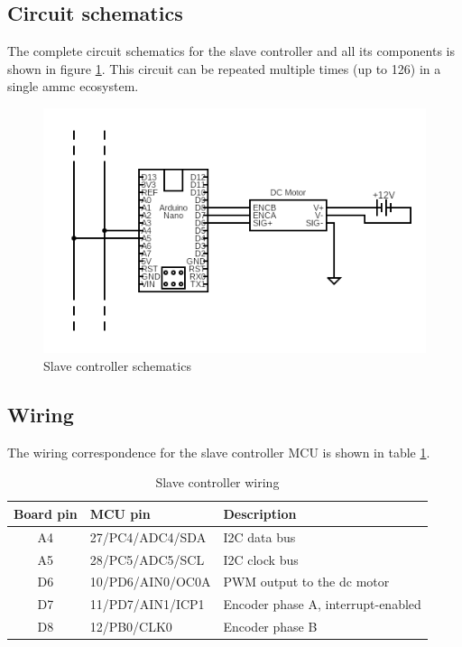 \documentclass[binding=0.6cm,Lau]{sapthesis}
\makeatletter
\def\maxwidth#1{\ifdim\Gin@nat@width>#1 #1\else\Gin@nat@width\fi}
\makeatother
\begin{document}
\subsection{Circuit schematics}
The complete circuit schematics for the slave controller and all its components
is shown in figure \ref{img:slave-sch}. This circuit can be repeated multiple
times (up to 126) in a single ammc ecosystem.
\begin{figure}[hbp]
\begin{centering}
  \includegraphics[width=\maxwidth{\textwidth}]{img/slave-schematics}
  \caption{Slave controller schematics}
  \label{img:slave-sch}
\end{centering}
\end{figure}

\subsection{Wiring}
The wiring correspondence for the slave controller MCU is shown in table
\ref{tab:slave-wiring}.
\begin{table}[hb]
  \begin{tabularx}{\textwidth}{c l X}
    \toprule
    Board pin & MCU pin & Description \\
    \midrule
    A4 & 27/PC4/ADC4/SDA  & I2C data bus \\
    A5 & 28/PC5/ADC5/SCL  & I2C clock bus \\
    D6 & 10/PD6/AIN0/OC0A & PWM output to the dc motor \\
    D7 & 11/PD7/AIN1/ICP1 & Encoder phase A, interrupt-enabled \\
    D8 & 12/PB0/CLK0      & Encoder phase B \\
    \bottomrule
  \end{tabularx}
  \caption{Slave controller wiring}
  \label{tab:slave-wiring}
\end{table}
\end{document}
